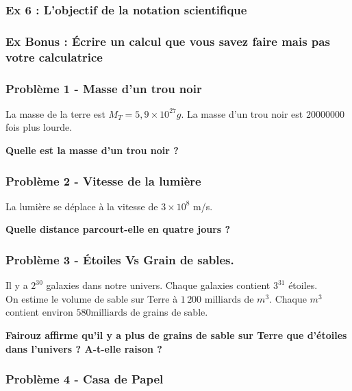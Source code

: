 \subsubsection*{Ex 6 : L'objectif de la notation scientifique}
\Pointilles[2]

\subsubsection*{Ex Bonus : Écrire un calcul que vous savez faire mais pas votre calculatrice}
\Pointilles[2]


\newpage

\subsubsection*{Problème 1 - Masse d'un trou noir}

La masse de la terre est $M_T = 5,9 \times 10^{27} g$. La masse d'un trou noir est $\SI{20000000}{}$ fois plus lourde. 

\textbf{Quelle est la masse d'un trou noir ?}

\Pointilles[4]

\subsubsection*{Problème 2 - Vitesse de la lumière}

La lumière se déplace à la vitesse de $3 \times 10^8$ m/s. 

\textbf{Quelle distance parcourt-elle en quatre jours ?}

\Pointilles[4]

\subsubsection*{Problème 3 - Étoiles Vs Grain de sables.}

Il y a $2^{30}$ galaxies dans notre univers. Chaque galaxies contient $3^{31}$ étoiles.  \\
On estime le volume de sable sur Terre à $1\,200 \text{ milliards de } m^3$. Chaque $m^3$ contient environ $580 \text{milliards}$ de grains de sable. 

\textbf{Fairouz affirme qu'il y a plus de grains de sable sur Terre que d'étoiles dans l'univers ? A-t-elle raison ?}

\Pointilles[4]

\subsubsection*{Problème 4 - Casa de Papel}

